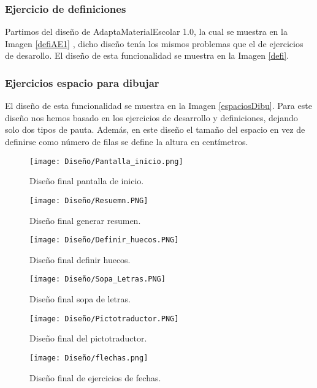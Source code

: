  \subsubsection{Ejercicio de definiciones}
 Partimos del diseño de AdaptaMaterialEscolar 1.0, la cual se muestra en la Imagen \ref{defiAE1} , dicho diseño tenía los mismos problemas que el de ejercicios de desarollo. El diseño de esta funcionalidad se muestra en la Imagen \ref{defi}.

 \subsubsection{Ejercicios espacio para dibujar}
 El diseño de esta funcionalidad se muestra en la Imagen \ref{espaciosDibu}. Para este diseño nos hemos basado en los ejercicios de desarrollo y definiciones, dejando solo dos  tipos de pauta. Además, en este diseño el tamaño del espacio en vez de definirse como número de filas se define la altura en centímetros.  


\begin{figure}[ht!]
  \centering
  \texttt{[image: Diseño/Pantalla\_inicio.png]}
  \caption{Diseño final pantalla de inicio.}
  \label{pantallaInicio}
\end{figure}

\begin{figure}[ht!]
  \centering
  \texttt{[image: Diseño/Resuemn.PNG]}
  \caption{Diseño final generar resumen.}
  \label{resuemn}
\end{figure}

\begin{figure}[ht!]
  \centering
  \texttt{[image: Diseño/Definir\_huecos.PNG]}
  \caption{Diseño final definir huecos.}
  \label{definir_hueco}
\end{figure}

\begin{figure}[ht!]
  \centering
  \texttt{[image: Diseño/Sopa\_Letras.PNG]}
  \caption{Diseño final sopa de letras.}
  \label{sopaLetras}
\end{figure}

\begin{figure}[ht!]
  \centering
  \texttt{[image: Diseño/Pictotraductor.PNG]}
  \caption{Diseño final del pictotraductor.}
  \label{pictotraductor}
\end{figure}

\begin{figure}[ht!]
  \centering
  \texttt{[image: Diseño/flechas.png]}
  \caption{Diseño final de ejercicios de fechas.}
  \label{flechas}
\end{figure}

